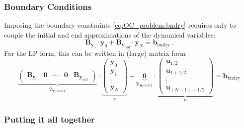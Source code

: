 \documentclass{article}
\newcommand{\vectorfont}[1]{\boldsymbol{#1}}%
\newcommand{\matrixfont}[1]{\mathbf{#1}}%
\newcommand{\bvec}{\vectorfont{b}}
\newcommand{\uvec}{\vectorfont{u}}
\newcommand{\yvec}{\vectorfont{y}}
\newcommand{\ufrakvec}{\vectorfont{\mathfrak{u}}}
\newcommand{\yfrakvec}{\vectorfont{\mathfrak{y}}}
\newcommand{\Bmat}{\matrixfont{B}}
\newcommand{\Afrakmat}{\matrixfont{\mathfrak{A}}}
\newcommand{\Nullmat}{\matrixfont{0}}
\begin{document}
\subsubsection*{Boundary Conditions}

Imposing the boundary constraints \eqref{eq:OC_problem:bndry} requires only to couple the initial and end approximations of the dynamical variables:
\[
\Bmat_{\yvec_0} \cdot \yvec_0 + \Bmat_{\yvec_{\mathrm{end}}} \cdot \yvec_N = \bvec_{\mathrm{bndry}}\,.
\]
For the LP form, this can be written in (large) matrix form
\[
\underbrace{
\begin{pmatrix} \Bmat_{\yvec_0} & \Nullmat & \cdots & \Nullmat & \Bmat_{\yvec_{\mathrm{end}}}\end{pmatrix}
}_{\Afrakmat_{\yvec,\mathrm{bndry}}}
\cdot
\underbrace{
\begin{pmatrix}
	\yvec_0 \\ \yvec_1 \\ \vdots \\ \yvec_N
\end{pmatrix}
}_{\yfrakvec}
+
\underbrace{\Nullmat}_{\Afrakmat_{\uvec,\mathrm{bndry}}}
\cdot 
\underbrace{
\begin{pmatrix}
	\uvec_{1/2} \\ \uvec_{1+1/2} \\ \vdots \\ \uvec_{(N-1)+1/2}
\end{pmatrix}
}_{\ufrakvec}
=
\bvec_{\mathrm{bndry}}
\]


\subsubsection*{Putting it all together}
\end{document}
